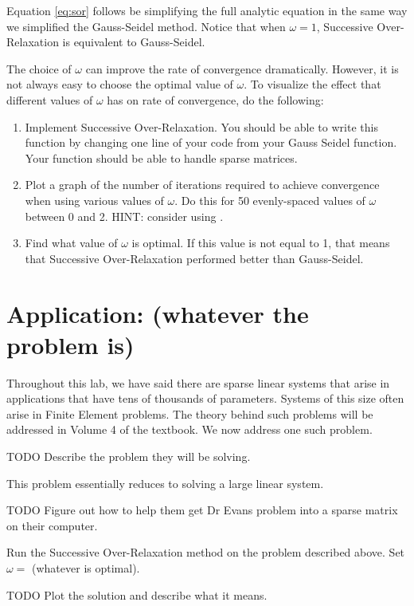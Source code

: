 Equation \ref{eq:sor} follows be simplifying the full analytic equation in the same way we simplified the Gauss-Seidel method. Notice that when $\omega = 1$, Successive Over-Relaxation is equivalent to Gauss-Seidel.

\begin{problem}
The choice of $\omega$ can improve the rate of convergence dramatically. However, it is not always easy to choose the optimal value of $\omega$. To visualize the effect that different values of $\omega$ has on rate of convergence, do the following:
\begin{enumerate}
    \item Implement Successive Over-Relaxation. You should be able to write this function by changing one line of your code from your Gauss Seidel function. Your function should be able to handle sparse matrices.
    \item Plot a graph of the number of iterations required to achieve convergence when using various values of $\omega$. Do this for 50 evenly-spaced values of $\omega$ between 0 and 2. HINT: consider using .
    \item Find what value of $\omega$ is optimal. If this value is not equal to 1, that means that Successive Over-Relaxation performed better than Gauss-Seidel.
\end{enumerate}
\end{problem}

\section*{Application: (whatever the problem is)}
Throughout this lab, we have said there are sparse linear systems that arise in applications that have tens of thousands of parameters. Systems of this size often arise in Finite Element problems. The theory behind such problems will be addressed in Volume 4 of the textbook. We now address one such problem.

\begin{problem} \label{prob:application}
TODO Describe the problem they will be solving.

This problem essentially reduces to solving a large linear system.

TODO Figure out how to help them get Dr Evans problem into a sparse matrix on their computer.

Run the Successive Over-Relaxation method on the problem described above. Set $\omega = $ (whatever is optimal).

TODO Plot the solution and describe what it means.
\end{problem}

